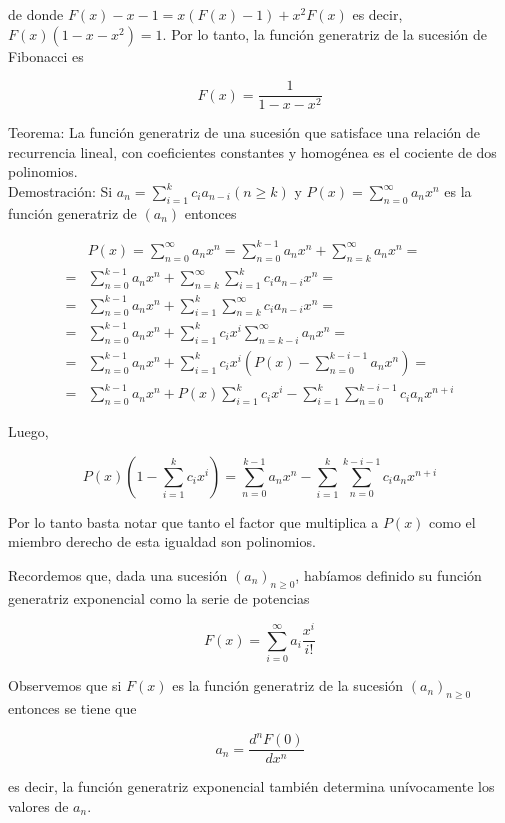 \documentclass[10pt]{article}
\begin{document}
de donde $F(x)-x-1=x(F(x)-1)+x^{2} F(x)$ es decir, $F(x)\left(1-x-x^{2}\right)=1$. Por lo tanto, la función generatriz de la sucesión de Fibonacci es

$$
F(x)=\frac{1}{1-x-x^{2}}
$$

Teorema: La función generatriz de una sucesión que satisface una relación de recurrencia lineal, con coeficientes constantes y homogénea es el cociente de dos polinomios.\\
Demostración: Si $a_{n}=\sum_{i=1}^{k} c_{i} a_{n-i}(n \geq k)$ y $P(x)=\sum_{n=0}^{\infty} a_{n} x^{n}$ es la función generatriz de $\left(a_{n}\right)$ entonces

$$
\begin{aligned}
& P(x)=\sum_{n=0}^{\infty} a_{n} x^{n}=\sum_{n=0}^{k-1} a_{n} x^{n}+\sum_{n=k}^{\infty} a_{n} x^{n}= \\
= & \sum_{n=0}^{k-1} a_{n} x^{n}+\sum_{n=k}^{\infty} \sum_{i=1}^{k} c_{i} a_{n-i} x^{n}= \\
= & \sum_{n=0}^{k-1} a_{n} x^{n}+\sum_{i=1}^{k} \sum_{n=k}^{\infty} c_{i} a_{n-i} x^{n}= \\
= & \sum_{n=0}^{k-1} a_{n} x^{n}+\sum_{i=1}^{k} c_{i} x^{i} \sum_{n=k-i}^{\infty} a_{n} x^{n}= \\
= & \sum_{n=0}^{k-1} a_{n} x^{n}+\sum_{i=1}^{k} c_{i} x^{i}\left(P(x)-\sum_{n=0}^{k-i-1} a_{n} x^{n}\right)= \\
= & \sum_{n=0}^{k-1} a_{n} x^{n}+P(x) \sum_{i=1}^{k} c_{i} x^{i}-\sum_{i=1}^{k} \sum_{n=0}^{k-i-1} c_{i} a_{n} x^{n+i}
\end{aligned}
$$

Luego,

$$
P(x)\left(1-\sum_{i=1}^{k} c_{i} x^{i}\right)=\sum_{n=0}^{k-1} a_{n} x^{n}-\sum_{i=1}^{k} \sum_{n=0}^{k-i-1} c_{i} a_{n} x^{n+i}
$$

Por lo tanto basta notar que tanto el factor que multiplica a $P(x)$ como el miembro derecho de esta igualdad son polinomios.

Recordemos que, dada una sucesión $\left(a_{n}\right)_{n \geq 0}$, habíamos definido su función generatriz exponencial como la serie de potencias

$$
F(x)=\sum_{i=0}^{\infty} a_{i} \frac{x^{i}}{i!}
$$

Observemos que si $F(x)$ es la función generatriz de la sucesión $\left(a_{n}\right)_{n \geq 0}$ entonces se tiene que

$$
a_{n}=\frac{d^{n} F(0)}{d x^{n}}
$$

es decir, la función generatriz exponencial también determina unívocamente los valores de $a_{n}$.
\end{document}
